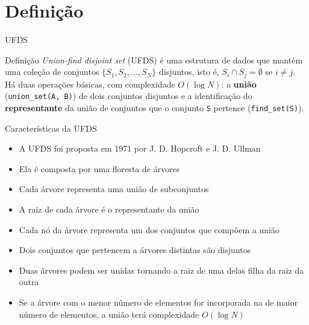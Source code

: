 \section{Definição}

\begin{frame}[fragile]{UFDS}

    \begin{block}{Definição}
        \textit{Union-find disjoint set} (UFDS) é uma estrutura de dados que mantém uma coleção
        de conjuntos $\lbrace S_1, S_2, \ldots, S_N\rbrace$ disjuntos, isto é, $S_i\cap S_j =
        \emptyset$ se $i\neq j$. Há duas operações básicas, com complexidade $O(\log N)$: a 
        \textbf{união} (\texttt{union\_set(A, B)}) de dois conjuntos disjuntos e a identificação 
        do \textbf{representante} da união de conjuntos que o conjunto \texttt{S} pertence 
        (\texttt{find\_set(S)}).
    \end{block}

\end{frame}

\begin{frame}[fragile]{Características da UFDS}

    \begin{itemize}
        \item A UFDS foi proposta em 1971 por J. D. Hopcroft e J. D. Ullman

        \item Ela é composta por uma floresta de árvores

        \item Cada árvore representa uma união de subconjuntos

        \item A raiz de cada árvore é o representante da união

        \item Cada nó da árvore representa um dos conjuntos que compõem a união

        \item Dois conjuntos que pertencem a árvores distintas são disjuntos

        \item Duas árvores podem ser unidas tornando a raiz de uma delas filha da raiz da outra

        \item Se a árvore com o menor número de elementos for incorporada na de maior número de
            elementos, a união terá complexidade $O(\log N)$
    \end{itemize}

\end{frame}

